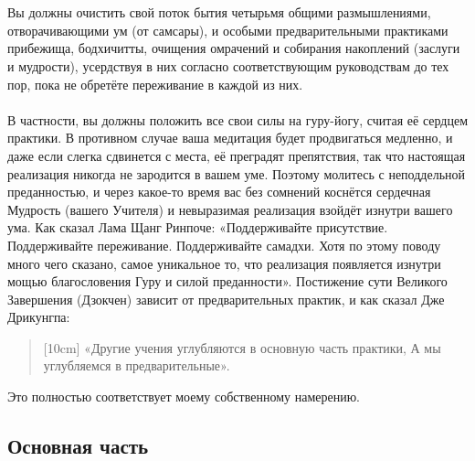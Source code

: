\\ \\ Вы должны очистить свой поток бытия четырьмя общими размышлениями, отворачивающими ум (от самсары), и особыми предварительными практиками прибежища, бодхичитты, очищения омрачений и собирания накоплений (заслуги и мудрости), усердствуя в них согласно соответствующим руководствам до тех пор, пока не обретёте переживание в каждой из них.
\\ \\ В частности, вы должны положить все свои силы на гуру-йогу, считая её сердцем практики. В противном случае ваша медитация будет продвигаться медленно, и даже если слегка сдвинется с места, её преградят препятствия, так что настоящая реализация никогда не зародится в вашем уме. Поэтому молитесь с неподдельной преданностью, и через какое-то время вас без сомнений коснётся сердечная Мудрость (вашего Учителя) и невыразимая реализация взойдёт изнутри вашего ума. Как сказал Лама Щанг Ринпоче:
«Поддерживайте присутствие. Поддерживайте переживание. Поддерживайте самадхи. Хотя по этому поводу много чего сказано, самое уникальное то, что реализация появляется изнутри мощью благословения Гуру и силой преданности».
Постижение сути Великого Завершения (Дзокчен) зависит от предварительных практик, и как сказал Дже Дрикунгпа:

\begin{verse}[10cm]
«Другие учения углубляются в основную часть практики,
А мы углубляемся в предварительные».
\end{verse}
Это полностью соответствует моему собственному намерению.

\subsection{Основная часть}

